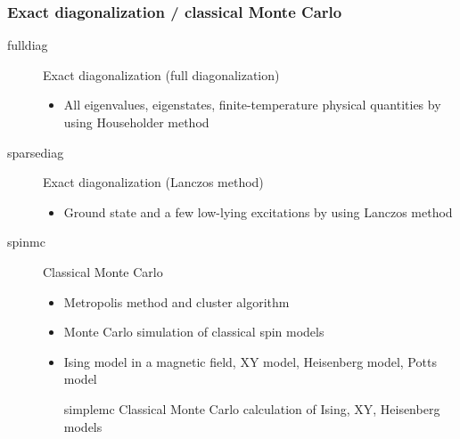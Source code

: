 \begin{frame}[t,fragile]
  \frametitle{Exact diagonalization / classical Monte Carlo}
  \begin{description}
  \item[fulldiag] Exact diagonalization (full diagonalization)
    \begin{itemize}
    \item All eigenvalues, eigenstates, finite-temperature physical quantities by using Householder method
    \end{itemize}
  \item[sparsediag] Exact diagonalization (Lanczos method)
    \begin{itemize}
    \item Ground state and a few low-lying excitations by using Lanczos method
    \end{itemize}
  \item[spinmc] Classical Monte Carlo
    \begin{itemize}
      \item Metropolis method and cluster algorithm
      \item Monte Carlo simulation of classical spin models
      \item Ising model in a magnetic field, XY model, Heisenberg model, Potts model
  \item[simplemc] Classical Monte Carlo calculation of Ising, XY, Heisenberg models
    \end{itemize}
  \end{description}
\end{frame}

